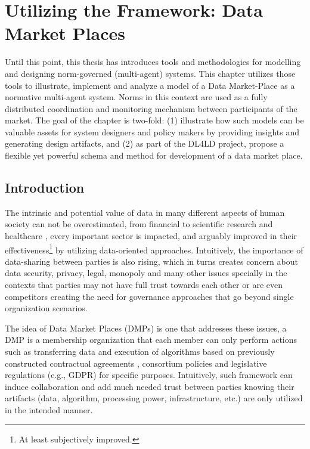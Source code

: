 \chapter{Utilizing the Framework: Data Market Places}
\label{ch:cmf}

Until this point, this thesis has introduces tools and methodologies for modelling and designing norm-governed (multi-agent) systems. This chapter utilizes those tools to illustrate, implement and analyze a model of a Data Market-Place as a normative multi-agent system. Norms in this context are used as a fully distributed coordination and monitoring mechanism between participants of the market. The goal of the chapter is two-fold: (1) illustrate how such models can be valuable assets for system designers and policy makers by providing insights and generating design artifacts, and (2) as part of the DL4LD project, propose a flexible yet powerful schema and method for development of a data market place.

\section{Introduction}
The intrinsic and potential value of data in many different aspects of human society can not be overestimated, from financial \cite{Hasan2020} to scientific research \cite{Yuri2013} and healthcare \cite{Shilo2020}, every important sector is impacted, and arguably improved in their effectiveness\footnote{At least subjectively improved.} by utilizing data-oriented approaches. Intuitively, the importance of data-sharing between parties is also rising, which in turns creates concern about data security, privacy, legal, monopoly and many other issues specially in the contexts that parties may not have full trust towards each other or are even competitors \cite{clifton2004privacy} creating the need for governance approaches that go beyond single organization scenarios. 

The idea of Data Market Places (DMPs) is one that addresses these issues, a DMP is a membership organization that each member can only perform actions such as transferring data and execution of algorithms based on previously constructed contractual agreements \cite{Zhang2019ModelingPlaces,Shakeri2019}, consortium policies and legislative regulations (e.g., GDPR) for specific purposes. Intuitively, such framework can induce collaboration and add much needed trust between parties knowing their artifacts (data, algorithm, processing power, infrastructure, etc.) are only utilized in the intended manner.

